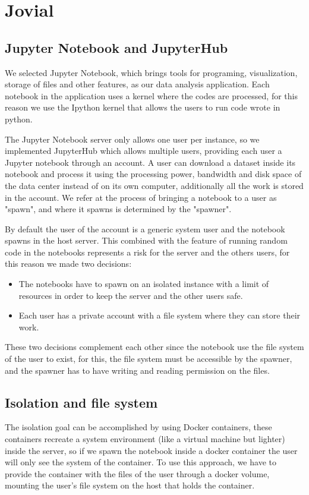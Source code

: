 \documentclass[11pt,twoside]{article}
\begin{document}
\section{Jovial}
\subsection{Jupyter Notebook and JupyterHub}

We selected Jupyter Notebook, which brings tools for programing, visualization, storage of files and other features, as our data analysis application. Each notebook in the application uses a kernel where the codes are processed, for this reason we use the Ipython kernel that allows the users to run code wrote in python.

The Jupyter Notebook server only allows one user per instance, so we implemented JupyterHub which allows multiple users, providing each user a Jupyter notebook through an account.  A user can download a dataset inside its notebook and process it using the processing power, bandwidth and disk space of the data center instead of on its own computer, additionally all the work is stored in the account. We refer at the process of bringing a notebook to a user as "spawn", and where it spawns is determined by the "spawner". 

By default the user of the account is a generic system user and the notebook spawns in the host server. This combined with the feature of running random code in the notebooks represents a risk for the server and the others users, for this reason we made two decisions:

\begin{itemize}
\item The notebooks have to spawn on an isolated instance with a limit of resources in order to keep the server and the other users safe.
\item Each user has a private account with a file system where they can store their work.
\end{itemize}
These two decisions complement each other since the notebook use the file system of the user to exist, for this, the file system must be accessible by the spawner, and the spawner has to have writing and reading permission on the files.

\subsection{Isolation and file system}
The isolation goal can be accomplished by using Docker containers, these containers recreate a system environment (like a virtual machine but lighter) inside the server, so if we spawn the notebook inside a docker container the user will only see the system of the container. To use this approach, we have to provide the container with the files of the user through a docker volume, mounting the user's file system on the host that holds the container. 
\end{document}

